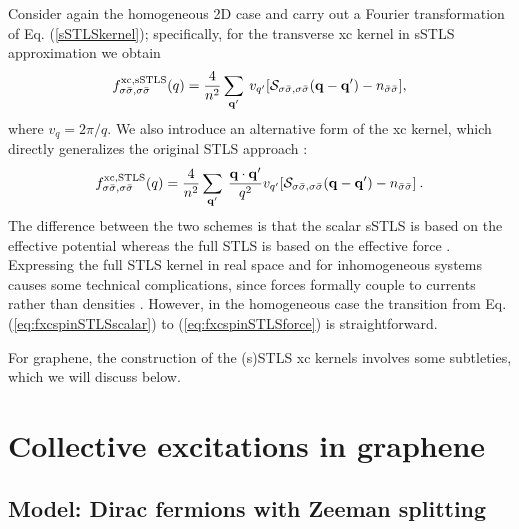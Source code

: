 \documentclass[aps,prb,twocolumn,superscriptaddress]{revtex4-2}
\newcommand{\SC}{{\cal S}}
\newcommand{\bfq}{{\bf q}}
\begin{document}
Consider again the homogeneous 2D case and carry out a Fourier transformation of Eq. (\ref{sSTLSkernel});
specifically, for the transverse xc kernel in sSTLS approximation we obtain
\begin{equation} \label{eq:fxcspinSTLSscalar}
f^{\rm xc, sSTLS}_{\sigma\bar\sigma,\sigma \bar\sigma}(q) = \frac{4}{n^2} \sum_{\bfq'} \: v_{q'}
[\SC_{\sigma\bar\sigma,\sigma \bar\sigma}(\bfq - \bfq') - n_{\bar\sigma\bar\sigma}],
\end{equation}
where $v_q=2\pi/q$.
We also introduce an alternative form of the xc kernel, which directly generalizes the original STLS approach \cite{Singwi1968}:
\begin{equation} \label{eq:fxcspinSTLSforce}
f^{\rm xc, STLS}_{\sigma\bar\sigma,\sigma\bar\sigma}(q) = \frac{4}{n^2}\sum_{\bfq'}  \:\frac{ \bfq \cdot \bfq'}{q^2} v_{q'}
[\SC_{\sigma\bar\sigma,\sigma\bar\sigma}(\bfq - \bfq') - n_{\bar\sigma\bar\sigma}] \:.
\end{equation}
The difference between the two schemes is that the scalar sSTLS is based on the effective potential whereas the
full STLS is based on the effective force \cite{GiulianiVignale}. Expressing the full STLS kernel in real space and for inhomogeneous systems causes some technical complications,
since forces formally couple to currents rather than densities \cite{Dobson2009}. However, in the homogeneous case the transition from Eq. (\ref{eq:fxcspinSTLSscalar})
to (\ref{eq:fxcspinSTLSforce}) is straightforward.

For graphene, the construction of the (s)STLS xc kernels involves some subtleties, which we will discuss below.



\section{Collective excitations in graphene}\label{sec3}

\subsection{Model: Dirac fermions with Zeeman splitting}\label{sec3A}
\end{document}
